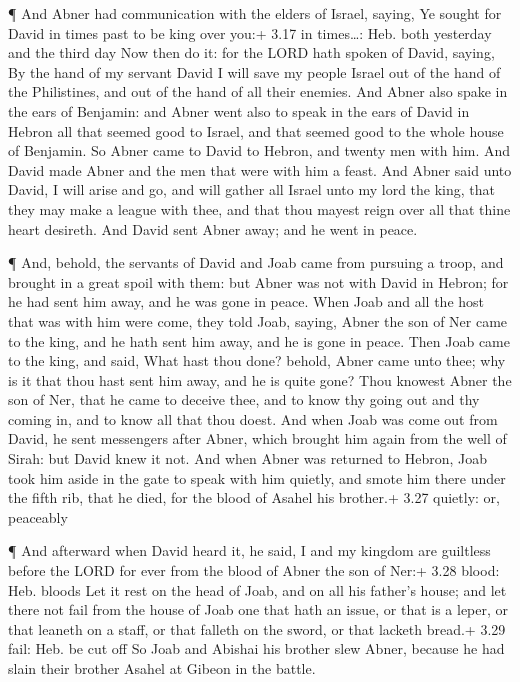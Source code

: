  ¶ And Abner had communication with the elders of Israel,
saying, Ye sought for David in times past to be king over you:+ 3.17 in
times\ldots: Heb. both yesterday and the third day  Now
then do it: for the LORD hath spoken of David, saying, By the hand of my
servant David I will save my people Israel out of the hand of the
Philistines, and out of the hand of all their enemies.  And
Abner also spake in the ears of Benjamin: and Abner went also to speak
in the ears of David in Hebron all that seemed good to Israel, and that
seemed good to the whole house of Benjamin.  So Abner came
to David to Hebron, and twenty men with him. And David made Abner and
the men that were with him a feast.  And Abner said unto
David, I will arise and go, and will gather all Israel unto my lord the
king, that they may make a league with thee, and that thou mayest reign
over all that thine heart desireth. And David sent Abner away; and he
went in peace.

 ¶ And, behold, the servants of David and Joab came from
pursuing a troop, and brought in a great spoil with them: but Abner was
not with David in Hebron; for he had sent him away, and he was gone in
peace.  When Joab and all the host that was with him were
come, they told Joab, saying, Abner the son of Ner came to the king, and
he hath sent him away, and he is gone in peace.  Then Joab
came to the king, and said, What hast thou done? behold, Abner came unto
thee; why is it that thou hast sent him away, and he is quite gone?
 Thou knowest Abner the son of Ner, that he came to deceive
thee, and to know thy going out and thy coming in, and to know all that
thou doest.  And when Joab was come out from David, he sent
messengers after Abner, which brought him again from the well of Sirah:
but David knew it not.  And when Abner was returned to
Hebron, Joab took him aside in the gate to speak with him quietly, and
smote him there under the fifth rib, that he died, for the blood of
Asahel his brother.+ 3.27 quietly: or, peaceably

 ¶ And afterward when David heard it, he said, I and my
kingdom are guiltless before the LORD for ever from the blood of Abner
the son of Ner:+ 3.28 blood: Heb. bloods  Let it rest on
the head of Joab, and on all his father's house; and let there not fail
from the house of Joab one that hath an issue, or that is a leper, or
that leaneth on a staff, or that falleth on the sword, or that lacketh
bread.+ 3.29 fail: Heb. be cut off  So Joab and Abishai his
brother slew Abner, because he had slain their brother Asahel at Gibeon
in the battle.

